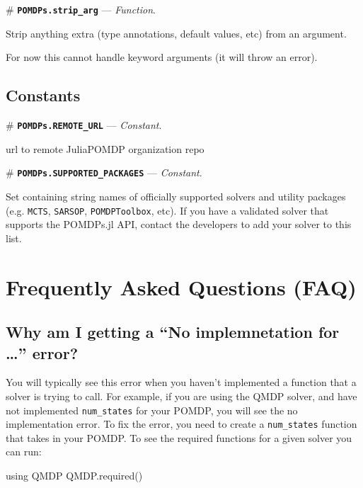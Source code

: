 \documentclass[12pt,]{article}
\newenvironment{Shaded}{}{}
\newcommand{\NormalTok}[1]{{#1}}
\begin{document}
\# \textbf{\texttt{POMDPs.strip\_arg}} --- \emph{Function}.

Strip anything extra (type annotations, default values, etc) from an
argument.

For now this cannot handle keyword arguments (it will throw an error).

\subsection{Constants}\label{constants}

\# \textbf{\texttt{POMDPs.REMOTE\_URL}} --- \emph{Constant}.

url to remote JuliaPOMDP organization repo

\# \textbf{\texttt{POMDPs.SUPPORTED\_PACKAGES}} --- \emph{Constant}.

Set containing string names of officially supported solvers and utility
packages (e.g. \texttt{MCTS}, \texttt{SARSOP}, \texttt{POMDPToolbox},
etc). If you have a validated solver that supports the POMDPs.jl API,
contact the developers to add your solver to this list.

\section{Frequently Asked Questions
(FAQ)}\label{frequently-asked-questions-faq}

\subsection{\texorpdfstring{Why am I getting a ``No implemnetation for
\ldots{}''
error?}{Why am I getting a No implemnetation for \ldots{} error?}}\label{why-am-i-getting-a-no-implemnetation-for-error}

You will typically see this error when you haven't implemented a
function that a solver is trying to call. For example, if you are using
the QMDP solver, and have not implemented \texttt{num\_states} for your
POMDP, you will see the no implementation error. To fix the error, you
need to create a \texttt{num\_states} function that takes in your POMDP.
To see the required functions for a given solver you can run:

\begin{Shaded}
\begin{Highlighting}[]
\NormalTok{using QMDP}
\NormalTok{QMDP.required()}
\end{Highlighting}
\end{Shaded}
\end{document}
